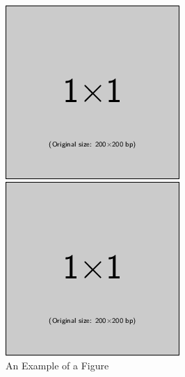 \documentclass[10pt,conference,a4paper,nofonttune]{IEEEtran}
\begin{document}
\begin{figure}[t]
\begin{minipage}{.45\hsize}
   \end{minipage}
   \\ \vspace{1em}
   \begin{minipage}{.45\hsize} 
      \centering
      \includegraphics[width=.8\hsize]{figure/example-image-1x1.png} %
   \end{minipage}
   \begin{minipage}{.45\hsize} 
      \centering
      \includegraphics[width=.8\hsize]{figure/example-image-1x1.png} %
   \end{minipage}
   \caption{An Example of a Figure}
   \label{fig:example}
\end{figure}
\end{document}
